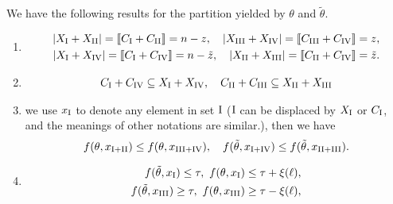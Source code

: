 \begin{claim}
	\label{claim-divide}
	We have the following results for the partition yielded by $ \theta $ and $ \tilde{\theta} $.
	\begin{enumerate}
		\item 
		\begin{align*}
			\left|X_\mathrm{\Rnum{1}}+X_\mathrm{\Rnum{2}}\right|=\left\llbracket C_\mathrm{\Rnum{1}}+C_\mathrm{\Rnum{2}}\right\rrbracket = n-z,\quad
			\left|X_\mathrm{\Rnum{3}}+X_\mathrm{\Rnum{4}}\right|=\left\llbracket C_\mathrm{\Rnum{3}}+C_\mathrm{\Rnum{4}}\right\rrbracket = z,\\
			\left|X_\mathrm{\Rnum{1}}+X_\mathrm{\Rnum{4}}\right|=\left\llbracket C_\mathrm{\Rnum{1}}+C_\mathrm{\Rnum{4}} \right\rrbracket = n-\tilde{z},\quad
			\left|X_\mathrm{\Rnum{2}}+X_\mathrm{\Rnum{3}}\right|=\left\llbracket C_\mathrm{\Rnum{2}}+C_\mathrm{\Rnum{4}}\right\rrbracket = \tilde{z}.
		\end{align*}
		\item 
		\begin{align*}
			C_\mathrm{\Rnum{1}}+C_\mathrm{\Rnum{4}}\subseteq X_\mathrm{\Rnum{1}}+X_\mathrm{\Rnum{4}},\quad
			C_\mathrm{\Rnum{2}}+C_\mathrm{\Rnum{3}}\subseteq X_\mathrm{\Rnum{2}}+X_\mathrm{\Rnum{3}}
		\end{align*}
		\item we use $ x_{\mathrm{\Rnum{1}}} $ to denote any element in set $ \mathrm{\Rnum{1}} $ ($ \mathrm{\Rnum{1}} $ can be displaced by $ X_{\mathrm{\Rnum{1}}} $ or $ C_{\mathrm{\Rnum{1}}} $, and the meanings of other notations are similar.), then we have \begin{align*}
			f(\theta,x_{\mathrm{\Rnum{1}+\Rnum{2}}})\leq f(\theta,x_{\mathrm{\Rnum{3}+\Rnum{4}}}) ,\quad
			f(\tilde{\theta},x_{\mathrm{\Rnum{1}+\Rnum{4}}})\leq f(\tilde{\theta},x_{\mathrm{\Rnum{2}+\Rnum{3}}}).
		\end{align*}
		\item 
		\begin{align*}
			f(\tilde{\theta},x_{\mathrm{\Rnum{1}}})\leq \tau,\  f(\theta,x_{\mathrm{\Rnum{1}}})\leq \tau+\xi(\ell),  \\
			f(\tilde{\theta},x_{\mathrm{\Rnum{3}}})\geq \tau,\  f(\theta,x_{\mathrm{\Rnum{3}}})\geq \tau-\xi(\ell), \\

\end{align*}
\end{enumerate}
\end{claim}
